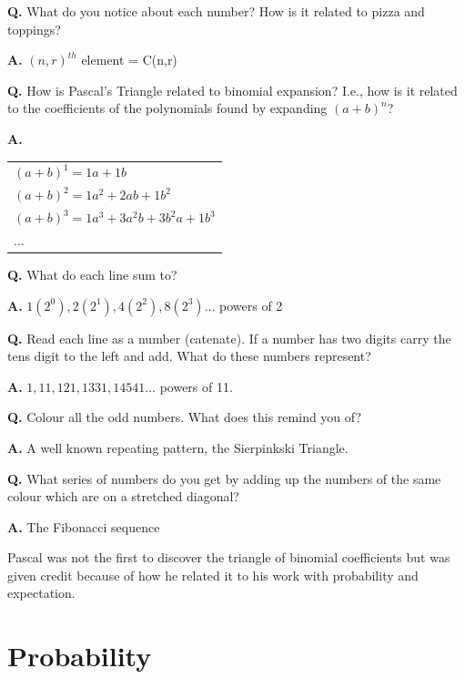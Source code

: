 \documentclass{article}
\begin{document}
\textbf{Q.} What do you notice about each number? How is it related to
pizza and toppings?

\textbf{A.} $(n,r)^{th}$ element = C(n,r)

\pagebreak

\text{}

\textbf{Q.} How is Pascal’s Triangle related to binomial expansion? I.e., how is it related to the coefficients of the polynomials found by expanding $(a + b)^n$?

\textbf{A.}\begin{tabular}{l}
$(a + b)^1 = 1a + 1b$\\
$(a + b)^2 = 1a^2 + 2ab + 1b^2$\\
$(a + b)^3 = 1a^3 + 3a^2b + 3b^2a + 1b^3$\\
$\dots$
\end{tabular}

\vspace{0.3cm}

\textbf{Q.} What do each line sum to?

\textbf{A.} $1(2^0), 2(2^1), 4(2^2), 8(2^3) \dots$ powers of 2

\vspace{0.3cm}

\textbf{Q.} Read each line as a number (catenate). If a number has two digits carry the tens digit to the left and add. What do these numbers represent?

\textbf{A.} $1, 11, 121, 1331, 14541 \dots$ powers of 11.

\vspace{0.3cm}

\textbf{Q.} Colour all the odd numbers. What does this remind you of?

\textbf{A.} A well known repeating pattern, the Sierpinkski Triangle.

\vspace{0.3cm}

  \textbf{Q.} What series of numbers do you get by adding up the numbers
of the same colour which are on a stretched diagonal?

\textbf{A.} The Fibonacci sequence

Pascal was not the first to discover the triangle of binomial coefficients but was given credit because of how he related it to his work with probability and expectation.

\pagebreak

\text{}

\section{Probability}
\end{document}

